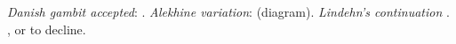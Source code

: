 \emph{Danish gambit accepted}: .
\emph{Alekhine variation}:  (diagram).
\emph{Lindehn's continuation} .
,  or  to decline.
